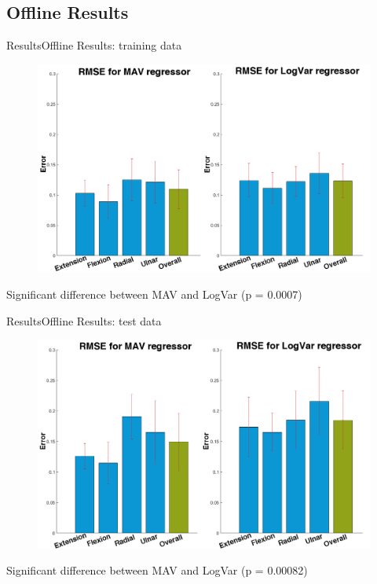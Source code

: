 \documentclass[10pt]{beamer}
\begin{document}
\subsection{Offline Results}
	\begin{frame}{Results}{Offline Results: training data}
		\begin{figure}
			\includegraphics[scale=0.27]{figures/gimmeThemRMSEBars.png}
		\end{figure}
	Significant difference between MAV and LogVar (p = 0.0007)
\end{frame}

\begin{frame}{Results}{Offline Results: test data}
\begin{figure}
	\includegraphics[scale=0.27]{figures/RMSEBarPlotNewData.png}
\end{figure}
Significant difference between MAV and LogVar (p = 0.00082)
\end{frame}
\end{document}
